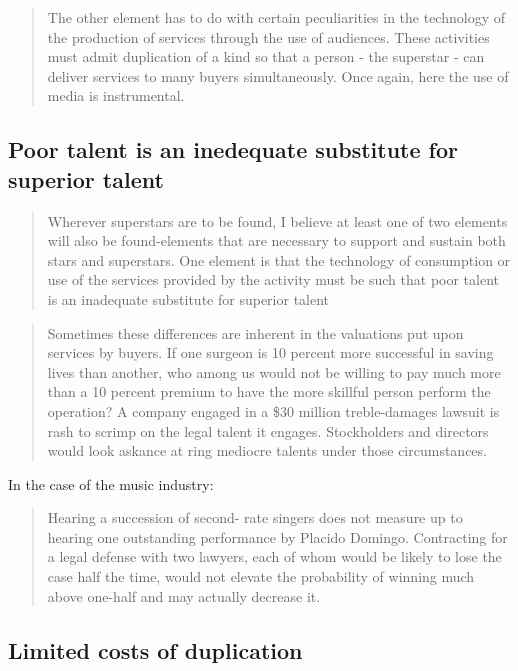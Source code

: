 \documentclass[]{book}
\theoremstyle{definition}
\theoremstyle{definition}
\theoremstyle{definition}
\theoremstyle{remark}
\begin{document}
\begin{quote}
The other element has to do with certain peculiarities in the technology
of the production of services through the use of audiences. These
activities must admit duplication of a kind so that a person - the
superstar - can deliver services to many buyers simultaneously. Once
again, here the use of media is instrumental.
\end{quote}

\subsection{Poor talent is an inedequate substitute for superior
talent}\label{poor-talent-is-an-inedequate-substitute-for-superior-talent}

\begin{quote}
Wherever superstars are to be found, I believe at least one of two
elements will also be found-elements that are necessary to support and
sustain both stars and superstars. One element is that the technology of
consumption or use of the services provided by the activity must be such
that poor talent is an inadequate substitute for superior talent
\end{quote}

\begin{quote}
Sometimes these differences are inherent in the valuations put upon
services by buyers. If one surgeon is 10 percent more successful in
saving lives than another, who among us would not be willing to pay much
more than a 10 percent premium to have the more skillful person perform
the operation? A company engaged in a \$30 million treble-damages
lawsuit is rash to scrimp on the legal talent it engages. Stockholders
and directors would look askance at ring mediocre talents under those
circumstances.
\end{quote}

In the case of the music industry:

\begin{quote}
Hearing a succession of second- rate singers does not measure up to
hearing one outstanding performance by Placido Domingo. Contracting for
a legal defense with two lawyers, each of whom would be likely to lose
the case half the time, would not elevate the probability of winning
much above one-half and may actually decrease it.
\end{quote}

\subsection{Limited costs of
duplication}\label{limited-costs-of-duplication}
\end{document}

